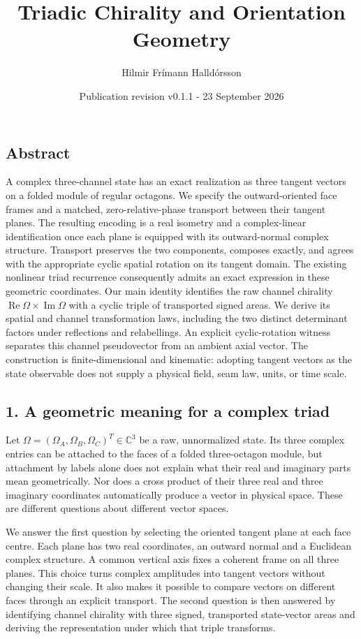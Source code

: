 \documentclass[
  11pt,
  a4paper,
]{article}
\title{Triadic Chirality and Orientation Geometry}
\author{Hilmir Frímann Halldórsson}
\date{Publication revision v0.1.1 - 23 September 2026}
\begin{document}
\maketitle

\subsection{Abstract}\label{abstract}

A complex three-channel state has an exact realization as three tangent vectors on a folded module of regular octagons. We specify the outward-oriented face frames and a matched, zero-relative-phase transport between their tangent planes. The resulting encoding is a real isometry and a complex-linear identification once each plane is equipped with its outward-normal complex structure. Transport preserves the two components, composes exactly, and agrees with the appropriate cyclic spatial rotation on its tangent domain. The existing nonlinear triad recurrence consequently admits an exact expression in these geometric coordinates. Our main identity identifies the raw channel chirality \(\operatorname{Re}\Omega\times\operatorname{Im}\Omega\) with a cyclic triple of transported signed areas. We derive its spatial and channel transformation laws, including the two distinct determinant factors under reflections and relabellings. An explicit cyclic-rotation witness separates this channel pseudovector from an ambient axial vector. The construction is finite-dimensional and kinematic: adopting tangent vectors as the state observable does not supply a physical field, seam law, units, or time scale.

\subsection{1. A geometric meaning for a complex triad}\label{a-geometric-meaning-for-a-complex-triad}

Let \(\Omega=(\Omega_A,\Omega_B,\Omega_C)^T\in\mathbb C^3\) be a raw, unnormalized state. Its three complex entries can be attached to the faces of a folded three-octagon module, but attachment by labels alone does not explain what their real and imaginary parts mean geometrically. Nor does a cross product of their three real and three imaginary coordinates automatically produce a vector in physical space. These are different questions about different vector spaces.

We answer the first question by selecting the oriented tangent plane at each face centre. Each plane has two real coordinates, an outward normal and a Euclidean complex structure. A common vertical axis fixes a coherent frame on all three planes. This choice turns complex amplitudes into tangent vectors without changing their scale. It also makes it possible to compare vectors on different faces through an explicit transport. The second question is then answered by identifying channel chirality with three signed, transported state-vector areas and deriving the representation under which that triple transforms.
\end{document}
